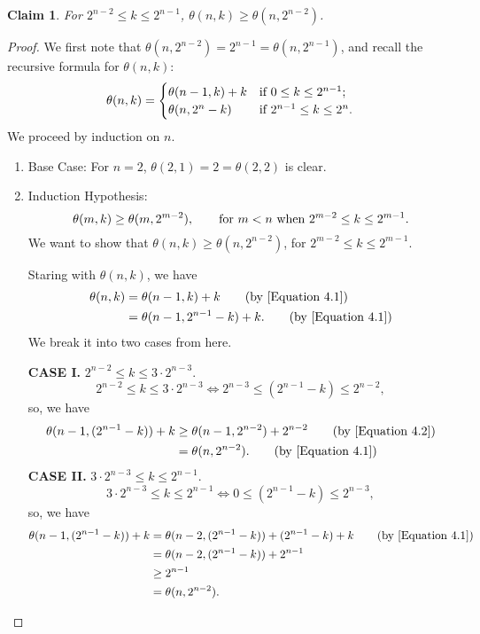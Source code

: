 \documentclass[12pt]{ucthesis}
\theoremstyle{plain}
\newtheorem{claim}{Claim}
\theoremstyle{definition}
\begin{document}
\begin{claim}
\label{Claim 3}
For $2^{n - 2} \le k \le 2^{n - 1}$, $\theta(n, k) \ge \theta(n, 2^{n - 2})$.
\end{claim}
\begin{proof}
We first note that $\theta(n, 2^{n - 2}) = 2^{n - 1} = \theta(n, 2^{n - 1})$,
and recall the recursive formula for $\theta(n, k)$:
\begin{equation}
\label{Equation 4.1}
\theta(n, k) = \begin{cases}
	\theta(n - 1, k) + k & \textnormal{if } 0 \le k \le 2^{n - 1}; \\
	\theta(n, 2^n - k) & \textnormal{if } 2^{n - 1} \le k \le 2^n.
\end{cases}
\end{equation}
We proceed by induction on $n$.
\begin{enumerate}[(1)]
\item Base Case: For $n = 2$, $\theta(2, 1) = 2 = \theta(2, 2)$ is clear.
\item Induction Hypothesis:
	\begin{equation}
	\label{Equation 4.2}
	\theta(m, k) \ge \theta(m, 2^{m - 2}), \qquad
	\textnormal{for } m < n \textnormal{ when } 2^{m - 2} \le k \le 2^{m - 1}.
	\end{equation}
	We want to show that $\theta(n, k) \ge \theta(n, 2^{n - 2})$,
	for $2^{m - 2} \le k \le 2^{m - 1}$.

	Staring with $\theta(n, k)$, we have
	\begin{align*}
	\theta(n, k) & = \theta(n - 1, k) + k \tag{by \ref{Equation 4.1}} \\
		     & = \theta(n - 1, 2^{n - 1} - k) + k. \tag{by \ref{Equation 4.1}}
	\end{align*}
	We break it into two cases from here.

	\textbf{CASE I.} $2^{n - 2} \le k \le 3 \cdot 2^{n - 3}$.
	\begin{equation*}
	2^{n - 2} \le k \le 3 \cdot 2^{n - 3} \iff 2^{n - 3} \le (2^{n - 1} - k) \le 2^{n - 2},
	\end{equation*}
	so, we have
	\begin{align*}
	\theta(n - 1, (2^{n - 1} - k)) + k
	& \ge \theta(n - 1, 2^{n - 2}) + 2^{n - 2} \tag{by \ref{Equation 4.2}} \\
	& = \theta(n, 2^{n - 2}). \tag{by \ref{Equation 4.1}}
	\end{align*}
	\textbf{CASE II.} $3 \cdot 2^{n - 3} \le k \le 2^{n - 1}$.
	\begin{equation*}
	3 \cdot 2^{n - 3} \le k \le 2^{n - 1} \iff 0 \le (2^{n - 1} - k) \le 2^{n - 3},
	\end{equation*}
	so, we have
	\begin{align*}
	\theta(n - 1, (2^{n - 1} - k)) + k
	& = \theta(n - 2, (2^{n - 1} - k)) + (2^{n - 1} - k) + k \tag{by \ref{Equation 4.1}} \\
	& = \theta(n - 2, (2^{n - 1} - k)) + 2^{n - 1} \\
	& \ge 2^{n - 1} \\
	& = \theta(n, 2^{n - 2}).
	\end{align*}
\end{enumerate}
\end{proof}
\end{document}
